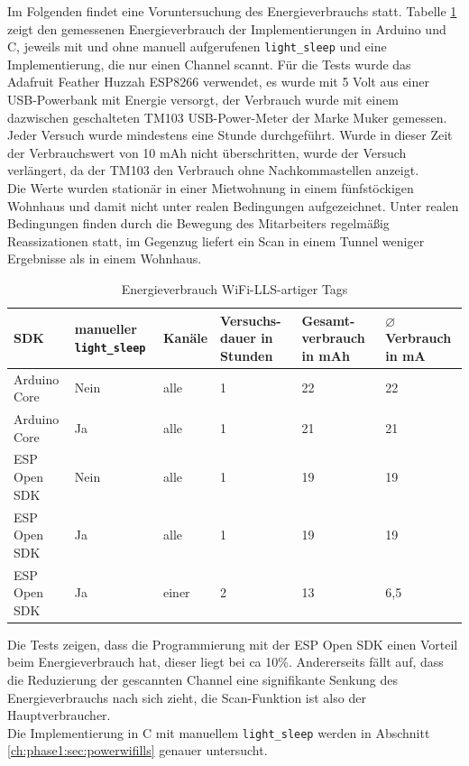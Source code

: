 Im Folgenden findet eine Voruntersuchung des Energieverbrauchs statt.
Tabelle \ref{table:llsconsumption} zeigt den gemessenen Energieverbrauch der Implementierungen in Arduino und C, jeweils mit und ohne manuell aufgerufenen \texttt{light\_sleep} und eine Implementierung, die nur einen Channel scannt.
Für die Tests wurde das Adafruit Feather Huzzah ESP8266 verwendet, es wurde mit 5 Volt aus einer USB-Powerbank mit Energie versorgt, der Verbrauch wurde mit einem dazwischen geschalteten TM103 USB-Power-Meter der Marke Muker gemessen. 
Jeder Versuch wurde mindestens eine Stunde durchgeführt.
Wurde in dieser Zeit der Verbrauchswert von 10 mAh nicht überschritten, wurde der Versuch verlängert, da der TM103 den Verbrauch ohne Nachkommastellen anzeigt.\\
Die Werte wurden stationär in einer Mietwohnung in einem fünfstöckigen Wohnhaus und damit nicht unter realen Bedingungen aufgezeichnet.
Unter realen Bedingungen finden durch die Bewegung des Mitarbeiters regelmäßig Reassizationen statt, im Gegenzug liefert ein Scan in einem Tunnel weniger Ergebnisse als in einem Wohnhaus.


\begin{table}[h]
	\centering
	\caption{Energieverbrauch WiFi-LLS-artiger Tags}
	\label{table:llsconsumption}
	\begin{tabular}{p{3cm}|p{2.2cm}|p{1.5cm}|p{2cm}|p{2cm}|p{2cm}}
		SDK & manueller \texttt{light\_sleep} & Kanäle & Versuchs-dauer in Stunden & Gesamt-verbrauch in mAh & $\varnothing$ Verbrauch in mA  \\
		\hline
		Arduino Core & Nein & alle & 1 & 22 & 22 \\
		Arduino Core & Ja & alle & 1 & 21 & 21 \\
		ESP Open SDK & Nein & alle & 1 & 19 & 19 \\
		ESP Open SDK & Ja & alle & 1 & 19 & 19 \\
		\hline
		ESP Open SDK & Ja & einer & 2 & 13 & 6,5 \\
	\end{tabular}
\end{table}

Die Tests zeigen, dass die Programmierung mit der ESP Open SDK einen Vorteil beim Energieverbrauch hat, dieser liegt bei ca 10\%.
Andererseits fällt auf, dass die Reduzierung der gescannten Channel eine signifikante Senkung des Energieverbrauchs nach sich zieht, die Scan-Funktion ist also der Hauptverbraucher.\\
Die Implementierung in C mit manuellem \texttt{light\_sleep} werden in Abschnitt \ref{ch:phase1:sec:powerwifills} genauer untersucht.

